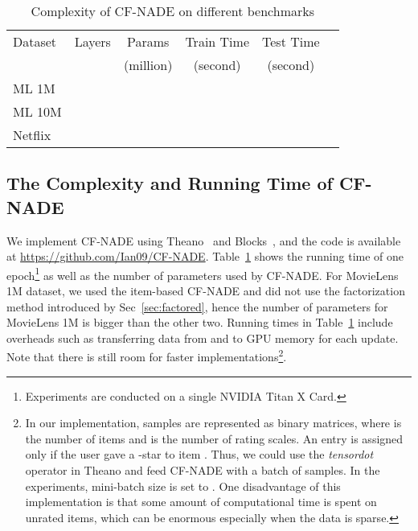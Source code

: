 \documentclass{article}
\newcommand{\cfnade}{CF-NADE\xspace}
\begin{document}
 \begin{table}[h]
\begin{small}
\centering
\caption{Complexity of \cfnade on different benchmarks}
\label{tab:complexity}
\begin{tabular}{@{}lccccc@{}}
\toprule
                Dataset & Layers & Params & Train Time & Test Time\\ 
                &&(million)&(second)&(second)\\ \midrule
\multirow{2}{*}{ML 1M} &     &  &   &   \\
                  &  &  &  &  \\
\multirow{2}{*}{ML 10M} &  &  &  &  \\
                  &  &  &  &  \\
\multirow{2}{*}{Netflix} &  &   &  &  \\
                  &  &  &  &  \\ \bottomrule
\end{tabular}
\end{small}
\end{table}



\subsection{The Complexity and Running Time of CF-NADE}
\label{exp:complexity}




We implement \cfnade using Theano~\cite{Bastien-Theano-2012} and
Blocks~\citep{van2015blocks}, and the code is available at
\url{https://github.com/Ian09/CF-NADE}. Table~\ref{tab:complexity} shows
the running time of one epoch\footnote{Experiments are conducted on a single NVIDIA Titan X Card.}  as
well as the number of parameters used by \cfnade. For MovieLens 1M dataset, we used the
item-based \cfnade and did not use the factorization method introduced
by Sec~\ref{sec:factored}, hence the number of parameters for
MovieLens 1M is bigger than the other two. Running times in
Table~\ref{tab:complexity} include overheads such as transferring data
from and to GPU memory for each update. Note that
there is still room for faster implementations\footnote{In our implementation, samples are
  represented as  binary matrices, where  is the number
  of items and  is the number of rating scales. An entry  is
  assigned  only if the user gave a -star to item . Thus, we
  could use the {\it tensordot} operator in Theano and feed \cfnade
  with a batch of samples. In the experiments, mini-batch size is set
  to . One disadvantage of this implementation is that some
  amount of computational time is spent on unrated items, which can be
  enormous especially when the data is sparse.
}.
\end{document}

